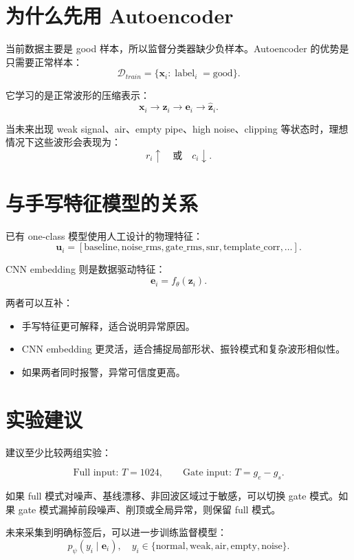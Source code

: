 \documentclass[UTF8,fontset=fandol]{ctexart}
\begin{document}
\section{为什么先用 Autoencoder}

当前数据主要是 good 样本，所以监督分类器缺少负样本。Autoencoder 的优势是只需要正常样本：
\[
  \mathcal{D}_{train} = \{\bm{x}_i: \operatorname{label}_i=\text{good}\}.
\]

它学习的是正常波形的压缩表示：
\[
  \bm{x}_i
  \longrightarrow
  \bm{z}_i
  \longrightarrow
  \bm{e}_i
  \longrightarrow
  \hat{\bm{z}}_i.
\]

当未来出现 weak signal、air、empty pipe、high noise、clipping 等状态时，理想情况下这些波形会表现为：
\[
  r_i \uparrow
  \quad\text{或}\quad
  c_i \downarrow.
\]

\section{与手写特征模型的关系}

已有 one-class 模型使用人工设计的物理特征：
\[
  \bm{u}_i =
  [
    \text{baseline},
    \text{noise\_rms},
    \text{gate\_rms},
    \text{snr},
    \text{template\_corr},
    \ldots
  ].
\]

CNN embedding 则是数据驱动特征：
\[
  \bm{e}_i = f_\theta(\bm{z}_i).
\]

两者可以互补：

\begin{itemize}
  \item 手写特征更可解释，适合说明异常原因。
  \item CNN embedding 更灵活，适合捕捉局部形状、振铃模式和复杂波形相似性。
  \item 如果两者同时报警，异常可信度更高。
\end{itemize}

\section{实验建议}

建议至少比较两组实验：

\[
  \text{Full input: } T=1024,
  \qquad
  \text{Gate input: } T=g_e-g_s.
\]

如果 full 模式对噪声、基线漂移、非回波区域过于敏感，可以切换 gate 模式。如果 gate 模式漏掉前段噪声、削顶或全局异常，则保留 full 模式。

未来采集到明确标签后，可以进一步训练监督模型：
\[
  p_\psi(y_i \mid \bm{e}_i),
  \quad
  y_i \in \{\text{normal}, \text{weak}, \text{air}, \text{empty}, \text{noise}\}.
\]
\end{document}
